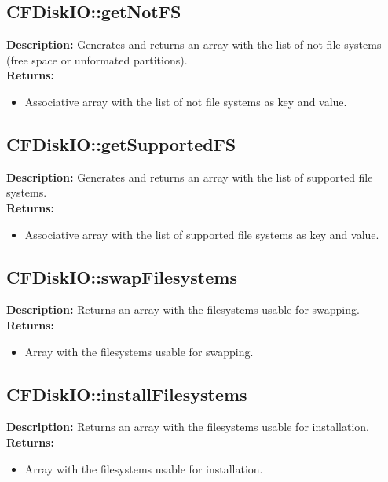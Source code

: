 \subsection{CFDiskIO::getNotFS}
\textbf{Description:} Generates and returns an array with the list of not file systems (free space or unformated partitions).\\
\textbf{Returns:}
\begin{itemize}
\item Associative array with the list of not file systems as key and value.
\end{itemize}

\subsection{CFDiskIO::getSupportedFS}
\textbf{Description:} Generates and returns an array with the list of supported file systems.\\
\textbf{Returns:}
\begin{itemize}
\item Associative array with the list of supported file systems as key and value.
\end{itemize}

\subsection{CFDiskIO::swapFilesystems}
\textbf{Description:} Returns an array with the filesystems usable for swapping.\\
\textbf{Returns:}
\begin{itemize}
\item Array with the filesystems usable for swapping.
\end{itemize}

\subsection{CFDiskIO::installFilesystems}
\textbf{Description:} Returns an array with the filesystems usable for installation.\\
\textbf{Returns:}
\begin{itemize}
\item Array with the filesystems usable for installation.
\end{itemize}

